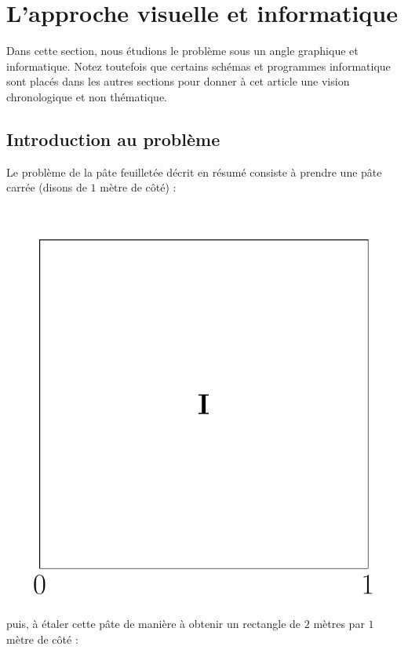 \documentclass[a4paper,french,12pt]{article}
\begin{document}
\vspace*{0.5cm}


\begin{center}
{\scriptsize \tableofcontents}
\end{center}

\clearpage


\section{L'approche visuelle et informatique}
Dans cette section, nous étudions le problème sous un angle graphique et informatique. Notez toutefois que certains schémas et programmes informatique sont placés dans les autres sections pour donner à cet article une vision chronologique et non thématique.


\subsection{Introduction au problème}
Le problème de la pâte feuilletée décrit en résumé consiste à prendre une pâte carrée (disons de $1$ mètre de côté) :

\vspace*{-0.5cm}

\begin{center}
\includegraphics[scale=0.275]{../TeXGraph/Pdf/intro_pate_1.pdf}
\end{center}
puis, à étaler cette pâte de manière à obtenir un rectangle de $2$ mètres par $1$ mètre de côté :
\end{document}
